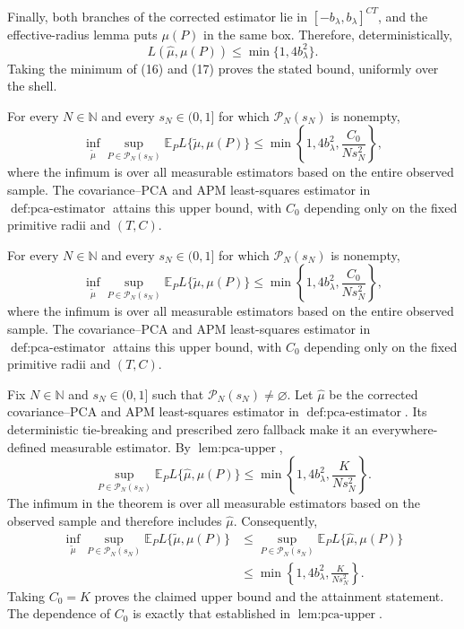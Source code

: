 Finally, both branches of the corrected estimator lie in \([-b_\lambda,b_\lambda]^{CT}\), and the effective-radius lemma puts \(\mu(P)\) in the same box.  Therefore, deterministically,
\[
L(\widehat\mu,\mu(P))
\le\min\{1,4b_\lambda^2\}.
\tag{17}
\]
Taking the minimum of (16) and (17) proves the stated bound, uniformly over the shell.

For every \(N\in\mathbb N\) and every \(s_N\in(0,1]\) for which \(\mathcal P_N(s_N)\) is nonempty,
\[
\inf_{\widetilde\mu}\sup_{P\in\mathcal P_N(s_N)}
\mathbb E_P L\{\widetilde\mu,\mu(P)\}
\le \min\!\left\{1,4b_\lambda^2,\frac{C_0}{Ns_N^2}\right\},
\]
where the infimum is over all measurable estimators based on the entire observed sample. The covariance--PCA and APM least-squares estimator in \(\operatorname{def:pca\text{-}estimator}\) attains this upper bound, with \(C_0\) depending only on the fixed primitive radii and \((T,C)\).

For every \(N\in\mathbb N\) and every \(s_N\in(0,1]\) for which \(\mathcal P_N(s_N)\) is nonempty,
\[
\inf_{\widetilde\mu}\sup_{P\in\mathcal P_N(s_N)}
\mathbb E_P L\{\widetilde\mu,\mu(P)\}
\le \min\!\left\{1,4b_\lambda^2,\frac{C_0}{Ns_N^2}\right\},
\]
where the infimum is over all measurable estimators based on the entire observed sample. The covariance--PCA and APM least-squares estimator in \(\operatorname{def:pca\text{-}estimator}\) attains this upper bound, with \(C_0\) depending only on the fixed primitive radii and \((T,C)\).

Fix \(N\in\mathbb N\) and \(s_N\in(0,1]\) such that \(\mathcal P_N(s_N)\ne\varnothing\).  Let \(\widehat\mu\) be the corrected covariance--PCA and APM least-squares estimator in \(\operatorname{def:pca\text{-}estimator}\).  Its deterministic tie-breaking and prescribed zero fallback make it an everywhere-defined measurable estimator.  By \(\operatorname{lem:pca\text{-}upper}\),
\[
\sup_{P\in\mathcal P_N(s_N)}
\mathbb E_P L\{\widehat\mu,\mu(P)\}
\le \min\!\left\{1,4b_\lambda^2,\frac{K}{Ns_N^2}\right\}.
\tag{1}
\]
The infimum in the theorem is over all measurable estimators based on the observed sample and therefore includes \(\widehat\mu\).  Consequently,
\[
\begin{aligned}
\inf_{\widetilde\mu}\sup_{P\in\mathcal P_N(s_N)}
\mathbb E_P L\{\widetilde\mu,\mu(P)\}
&\le
\sup_{P\in\mathcal P_N(s_N)}
\mathbb E_P L\{\widehat\mu,\mu(P)\}\\
&\le \min\!\left\{1,4b_\lambda^2,\frac{K}{Ns_N^2}\right\}.
\end{aligned}
\]
Taking \(C_0=K\) proves the claimed upper bound and the attainment statement.  The dependence of \(C_0\) is exactly that established in \(\operatorname{lem:pca\text{-}upper}\).

